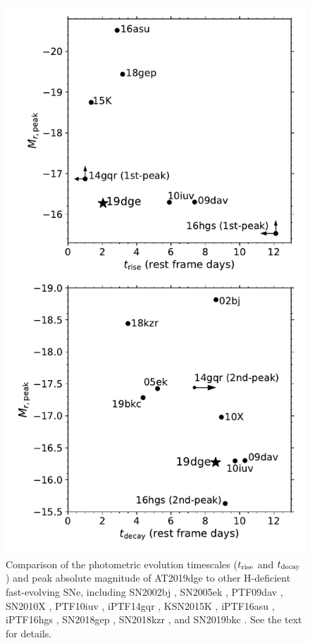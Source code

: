 \documentclass[twocolumn]{aastex63}
\begin{document}
\begin{CJK*}{UTF8}{gbsn}
\begin{figure}[htbp!]
	\centering
	\includegraphics[width=\columnwidth]{figures/compare_mag.pdf}
	\caption{Comparison of the photometric evolution timescales ($t_{\rm rise}$ and $t_{\rm  
			decay}$) and peak absolute magnitude of AT2019dge to other H-deficient fast-evolving SNe, 
		including
		SN2002bj \citep{Poznanski2010},
		SN2005ek \citep{Drout2013},  
		PTF09dav \citep{Sullivan2011},
		SN2010X \citep{Kasliwal2010},
		PTF10iuv \citep{Kasliwal2012},
		iPTF14gqr \citep{De2018},
		KSN2015K \citep{Rest2018},
		 iPTF16asu	\citep{Whitesides2017}, 
		 iPTF16hgs \citep{DeKC2018},
		SN2018gep \citep{Ho2019},
		SN2018kzr \citep{McBrien2019}, 
		and SN2019bkc \citep{Chen2020}. See the text for details.
		\label{fig:compare_mag}}
\end{figure}



\end{CJK*}
\end{document}

